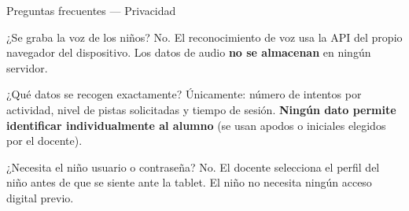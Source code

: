 \documentclass[aspectratio=169, 11pt]{beamer}
\begin{document}
\appendix

\begin{frame}{Preguntas frecuentes — Privacidad}
  \small
  \begin{block}{¿Se graba la voz de los niños?}
    No. El reconocimiento de voz usa la API del propio navegador del dispositivo.
    Los datos de audio \textbf{no se almacenan} en ningún servidor.
  \end{block}
  \vspace{4pt}
  \begin{block}{¿Qué datos se recogen exactamente?}
    Únicamente: número de intentos por actividad, nivel de pistas solicitadas y tiempo de sesión.
    \textbf{Ningún dato permite identificar individualmente al alumno} (se usan apodos o iniciales elegidos por el docente).
  \end{block}
  \vspace{4pt}
  \begin{block}{¿Necesita el niño usuario o contraseña?}
    No. El docente selecciona el perfil del niño antes de que se siente ante la tablet.
    El niño no necesita ningún acceso digital previo.
  \end{block}
\end{frame}
\end{document}
